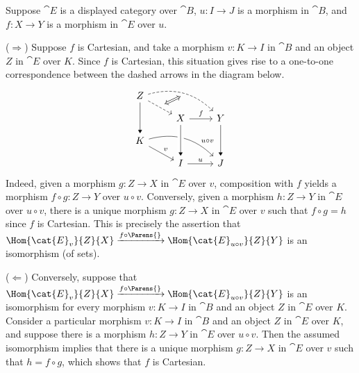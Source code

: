 \begin{solution}
Suppose \(\cat{E}\) is a displayed category over \(\cat{B}\), \(u : I \to J\) is a morphism in \(\cat{B}\), and \(f : X \to Y\) is a morphism in \(\cat{E}\) over \(u\).

(\(\Longrightarrow\))
Suppose \(f\) is Cartesian, and take a morphism \(v : K \to I\) in \(\cat{B}\) and an object \(Z\) in \(\cat{E}\) over \(K\).
Since \(f\) is Cartesian, this situation gives rise to a one-to-one correspondence between the dashed arrows in the diagram below.
\begin{equation*}
\begin{tikzcd}[row sep=small]
Z \arrow[rd, dashed, ""{name=A}] \arrow[dd, -Triangle] \arrow[rrd, dashed, bend left, ""{name=B, below}] \\
& X \arrow[dd, -Triangle] \arrow[r, "f"] & Y \arrow[dd, -Triangle] \\
K \arrow[rd, "v"] \arrow[rrd, bend left, near end, "u \circ v"] \\
& I \arrow[r, "u"] & J
\arrow[from=uul, to=l, -Triangle, crossing over]
\arrow[from=A, to=B, Leftrightarrow]
\end{tikzcd}
\end{equation*}
Indeed, given a morphism \(g : Z \to X\) in \(\cat{E}\) over \(v\), composition with \(f\) yields a morphism \(f \circ g : Z \to Y\) over \(u \circ v\).
Conversely, given a morphism \(h :Z \to Y\) in \(\cat{E}\) over \(u \circ v\), there is a unique morphism \(g : Z \to X\) in \(\cat{E}\) over \(v\) such that \(f \circ g = h\) since \(f\) is Cartesian.
This is precisely the assertion that \(\Hom{\cat{E}_v}{Z}{X} \xrightarrow{f \circ \Parens{}} \Hom{\cat{E}_{u \circ v}}{Z}{Y}\) is an isomorphism (of sets).

(\(\Longleftarrow\))
Conversely, suppose that \(\Hom{\cat{E}_v}{Z}{X} \xrightarrow{f \circ \Parens{}} \Hom{\cat{E}_{u \circ v}}{Z}{Y}\) is an isomorphism for every morphism \(v : K \to I\) in \(\cat{B}\) and an object \(Z\) in \(\cat{E}\) over \(K\).
Consider a particular morphism \(v : K \to I\) in \(\cat{B}\) and an object \(Z\) in \(\cat{E}\) over \(K\), and suppose there is a morphism \(h : Z \to Y\) in \(\cat{E}\) over \(u \circ v\).
Then the assumed isomorphism implies that there is a unique morphism \(g : Z \to X\) in \(\cat{E}\) over \(v\) such that \(h = f \circ g\), which shows that \(f\) is Cartesian.
\end{solution}